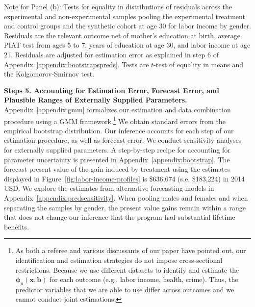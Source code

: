 \begin{table}[!htpb]
\begin{threeparttable}
\begin{tablenotes}
Note for Panel (b): Tests for equality in distributions of residuals across the experimental and non-experimental samples pooling the experimental treatment and control groups and the synthetic cohort at age 30 for labor income by gender.  Residuals are the relevant outcome net of mother's education at birth, average PIAT test from ages 5 to 7, years of education at age 30, and labor income at age 21. Residuals are adjusted for estimation error as explained in step 6 of Appendix~\ref{appendix:bootstrapspreds}. Tests are $t$-test of equality in means and the Kolgomorov-Smirnov test.\\
\end{tablenotes}
\end{threeparttable}
\end{table}

\textbf{Steps 5. Accounting for Estimation Error, Forecast Error, and Plausible Ranges of Externally Supplied Parameters.}  Appendix~\ref{appendix:gmm} formalizes our estimation and data combination procedure using a GMM framework.\footnote{As both a referee and various discussants of our paper have pointed out, our identification and estimation strategies do not impose cross-sectional restrictions. Because we use different datasets to identify and estimate the  $\bm{\phi}_{a} \left( \bm{x}, \bm{b} \right)$ for each outcome (e.g., labor income, health, crime). Thus, the predictor variables that we are able to use differ across outcomes and we cannot conduct joint estimations.} We obtain standard errors from the empirical bootstrap distribution. Our inference accounts for each step of our estimation procedure, as well as forecast error. We conduct sensitivity analyses for externally supplied parameters. A step-by-step recipe for accounting for parameter uncertainty is presented in Appendix~\ref{appendix:bootstrap}. The forecast present value of the gain induced by treatment using the estimates displayed in Figure~\ref{fig:labor-income-profiles} is \$636,674 (s.e. \$183,224) in 2014 USD. We explore the estimates from alternative forecasting models in Appendix~\ref{appendix:predsensitivity}. When pooling males and females and when separating the samples by gender, the present value gains remain within a range that does not change our inference that the program had substantial lifetime benefits.

